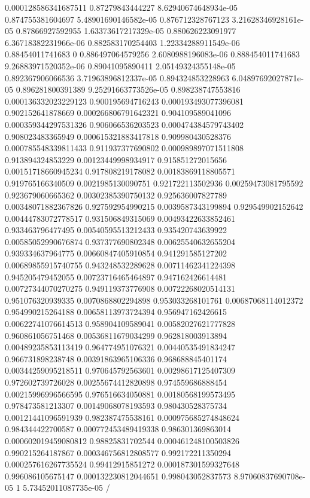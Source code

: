 \begin{table}
\begin{tabu}
\begin{sparkline}{10}
0.000128586341687511 0.87279843444227 8.62940674648934e-05 0.874755381604697 5.48901690146582e-05 0.876712328767123 3.21628346928161e-05 0.87866927592955 1.63373617217329e-05 0.880626223091977 6.36718382231966e-06 0.882583170254403 1.22334288911549e-06 0.88454011741683 0 0.886497064579256 2.6080988196083e-06 0.888454011741683 9.26883971520352e-06 0.89041095890411 2.05149324355148e-05 0.892367906066536 3.71963896812337e-05 0.894324853228963 6.04897692027871e-05 0.896281800391389 9.25291663773526e-05 0.898238747553816 0.000136332023229123 0.900195694716243 0.000193493077396081 0.902152641878669 0.000266806791642321 0.904109589041096 0.000359344297531326 0.906066536203523 0.000474384579743402 0.908023483365949 0.000615321883417818 0.909980430528376 0.000785548339811433 0.911937377690802 0.000989897071511808 0.913894324853229 0.00123449998934917 0.915851272015656 0.00151718660945234 0.917808219178082 0.00183869118805571 0.919765166340509 0.0021985130090751 0.921722113502936 0.00259473081795592 0.923679060665362 0.00302385390750132 0.925636007827789 0.00348071882367826 0.927592954990215 0.0039587343199894 0.929549902152642 0.00444783072778517 0.931506849315069 0.00493422633852461 0.933463796477495 0.00540595513212433 0.935420743639922 0.00585052990676874 0.937377690802348 0.00625540632655204 0.939334637964775 0.00660847405910854 0.941291585127202 0.00689855915740755 0.943248532289628 0.00711462341224398 0.945205479452055 0.00723716465464897 0.947162426614481 0.00727344070270275 0.949119373776908 0.00722268020514131 0.951076320939335 0.0070868802294898 0.953033268101761 0.00687068114012372 0.954990215264188 0.00658113973724394 0.956947162426615 0.00622741076614513 0.958904109589041 0.00582027621777828 0.960861056751468 0.00536811679034299 0.962818003913894 0.00489235853113419 0.964774951076321 0.00440535491834247 0.966731898238748 0.00391863965106336 0.968688845401174 0.00344259095218511 0.970645792563601 0.00298617125407309 0.972602739726028 0.00255674412820898 0.974559686888454 0.00215996996566595 0.976516634050881 0.00180568199573495 0.978473581213307 0.00149068078193593 0.980430528375734 0.00121441096591939 0.982387475538161 0.000975685274848624 0.984344422700587 0.000772453489419338 0.986301369863014 0.000602019459080812 0.98825831702544 0.000461248100503826 0.990215264187867 0.000346756812808577 0.992172211350294 0.000257616267735524 0.99412915851272 0.000187301599327648 0.996086105675147 0.000132230812044651 0.998043052837573 8.97060837690708e-05 1 5.73452011087735e-05 /
\end{sparkline}\\

\end{tabu}
\end{table}
